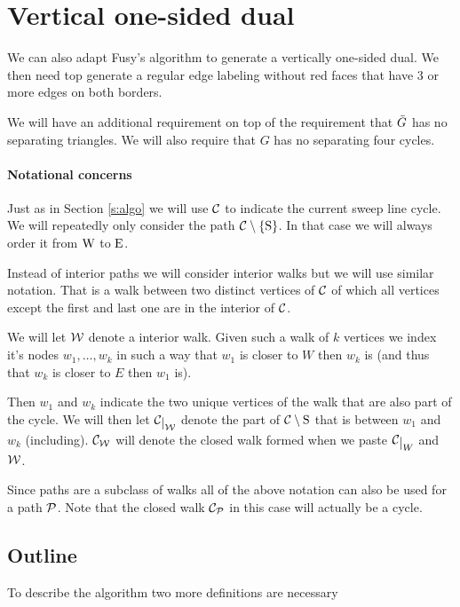 

\section{Vertical one-sided dual}
\label{s:red}

We can also adapt Fusy's algorithm to generate a vertically one-sided dual. We then need top generate a regular edge labeling without red faces that have $3$ or more edges on both borders.

We will have an additional requirement on top of the requirement that $\ext G$ has no separating triangles. We will also require that $G$ has no separating four cycles.


\paragraph{Notational concerns}
  Just as in Section \ref{s:algo} we will use $\C$ to indicate the current sweep line cycle.
  We will repeatedly only consider the path $\cpath$. In that case we will always order it from $\pW$ to $\pE$.

  Instead of interior paths we will consider interior walks but we will use similar notation. That is a walk between two distinct vertices of $\C$ of which all vertices except the first and last one are in the interior of $\C$.

  We will let $\W$ denote a interior walk. Given such a walk of $k$ vertices we index it's nodes $w_1, \ldots, w_k$  in such a way that $w_1$ is closer to $W$ then $w_k$ is (and thus that $w_k$ is closer to $E$ then $w_1$ is).

  Then $w_1$ and $w_k$ indicate the two unique vertices of the walk that are also part of the cycle. We will then let $\restC{\W}$ denote the part of $\C\setminus {\mathrm{S}}$ that is between $w_1$ and $w_k$ (including). $\C_\W$ will denote the closed walk formed when we paste $\restC{W}$ and $\W$.

  Since paths are a subclass of walks all of the above notation can also be used for a path $\P$. Note that the closed walk $\C_\P$ in this case will actually be a cycle.


\subsection{Outline}
  To describe the algorithm two more definitions are necessary

